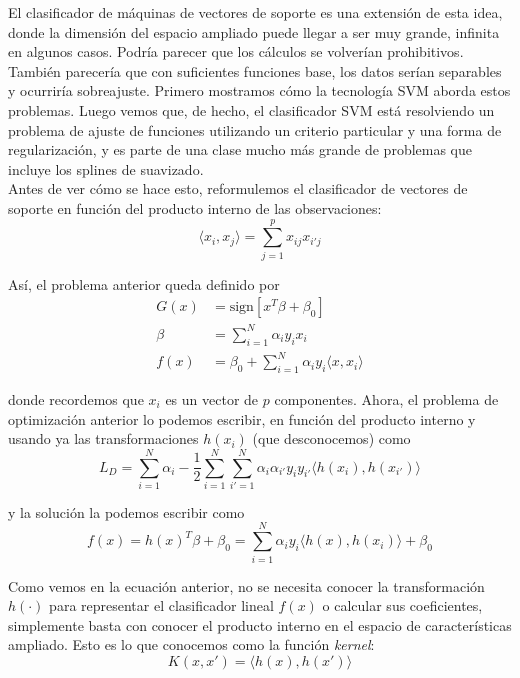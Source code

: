 El clasificador de máquinas de vectores de soporte es una extensión de esta idea, donde la dimensión del espacio ampliado puede llegar a ser muy grande, infinita en algunos casos. Podría parecer que los cálculos se volverían prohibitivos. También parecería que con suficientes funciones base, los datos serían separables y ocurriría sobreajuste. Primero mostramos cómo la tecnología SVM aborda estos problemas. Luego vemos que, de hecho, el clasificador SVM está resolviendo un problema de ajuste de funciones utilizando un criterio particular y una forma de regularización, y es parte de una clase mucho más grande de problemas que incluye los splines de suavizado. \\

Antes de ver cómo se hace esto, reformulemos el clasificador de vectores de soporte en función del producto interno de las observaciones:
\begin{equation}
\langle x_i, x_j \rangle = \sum_{j = 1}^p x_{ij} x_{i'j}
\end{equation}

\noindent Así, el problema anterior queda definido por 
\begin{align}
G(x) &= \text{sign} [x^T \beta + \beta_0] \\
\beta &= \sum_{i=1}^N \alpha_i y_i x_i \\
f(x) &= \beta_0 + \sum_{i = 1}^N \alpha_i y_i \langle x, x_i \rangle
\end{align}

\noindent donde recordemos que $x_i$ es un vector de $p$ componentes. Ahora, el problema de optimización anterior lo podemos escribir, en función del producto interno y usando ya las transformaciones $h(x_i)$ (que desconocemos) como
\begin{equation}
L_D = \sum_{i = 1}^N \alpha_i - \frac{1}{2} \sum_{i = 1}^N \sum_{i' = 1}^N \alpha_i \alpha_{i'} y_i y_{i'} \langle h(x_i), h(x_{i'}) \rangle
\end{equation}

\noindent y la solución la podemos escribir como 
\begin{equation}
f(x) = h(x)^T \beta + \beta_0 = \sum_{i = 1}^N \alpha_i y_i \langle h(x), h(x_i) \rangle + \beta_0
\end{equation}

Como vemos en la ecuación anterior, no se necesita conocer la transformación $h(\cdot)$ para representar el clasificador lineal $f(x)$ o calcular sus coeficientes, simplemente basta con conocer el producto interno en el espacio de características ampliado. Esto es lo que conocemos como la función \textit{kernel}:
\begin{equation}
K(x, x') = \langle h(x), h(x') \rangle
\end{equation}

